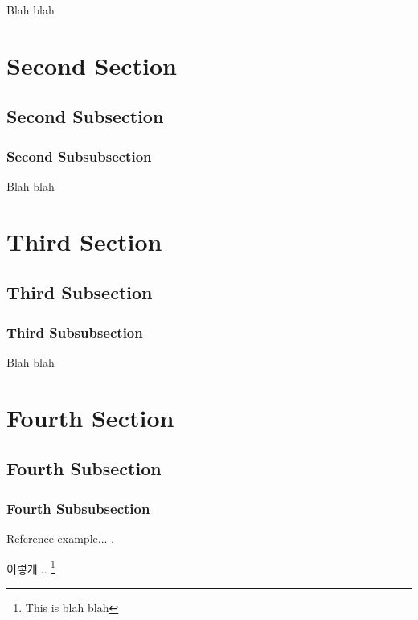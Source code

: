 \documentclass[11pt]{book}
\begin{document}
Blah blah

\section{Second Section}

\subsection{Second Subsection}

\subsubsection{Second Subsubsection}

Blah blah

\section{Third Section}

\subsection{Third Subsection}

\subsubsection{Third Subsubsection}

Blah blah

\section{Fourth Section}

\subsection{Fourth Subsection}

\subsubsection{Fourth Subsubsection}

Reference example... \cite{Tsa2006}.




\newpage

\renewcommand\thefootnote{\fnsymbol{footnote}}

이렇게... \footnote[1]{This is blah blah}
\end{document}
